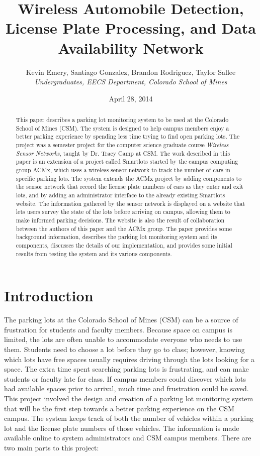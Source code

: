 \documentclass[11pt, oneside, fullpage, doublespace]{article}
\title{Wireless Automobile Detection, License Plate Processing, and Data Availability Network}
\author{Kevin Emery, Santiago Gonzalez, Brandon Rodriguez, Taylor Sallee\\ \emph{Undergraduates, EECS Department, Colorado School of Mines}}
\date{April 28, 2014}
\begin{document}
\maketitle

\begin{abstract}
This paper describes a parking lot monitoring system to be used at the Colorado School of Mines (CSM). The system is designed to help campus members enjoy a better parking experience by spending less time trying to find open parking lots. The project was a semester project for the computer science graduate course \emph{Wireless Sensor Networks}, taught by Dr. Tracy Camp at CSM. The work described in this paper is an extension of a project called Smartlots started by the campus computing group ACMx, which uses a wireless sensor network to track the number of cars in specific parking lots. The system extends the ACMx project by adding components to the sensor network that record the license plate numbers of cars as they enter and exit lots, and by adding an administrator interface to the already existing Smartlots website. The information gathered by the sensor network is displayed on a website that lets users survey the state of the lots before arriving on campus, allowing them to make informed parking decisions. The website is also the result of collaboration between the authors of this paper and the ACMx group. The paper provides some background information, describes the parking lot monitoring system and its components, discusses the details of our implementation, and provides some initial results from testing the system and its various components.
\end{abstract}

\section{Introduction}
The parking lots at the Colorado School of Mines (CSM) can be a source of frustration for students and faculty members. Because space on campus is limited, the lots are often unable to accommodate everyone who needs to use them. Students need to choose a lot before they go to class; however, knowing which lots have free spaces usually requires driving through the lots looking for a space. The extra time spent searching parking lots is frustrating, and can make students or faculty late for class. If campus members could discover which lots had available spaces prior to arrival, much time and frustration could be saved. This project involved the design and creation of a parking lot monitoring system that will be the first step towards a better parking experience on the CSM campus. The system keeps track of both the number of vehicles within a parking lot and the license plate numbers of those vehicles. The information is made available online to system administrators and CSM campus members. There are two main parts to this project:
\end{document}
